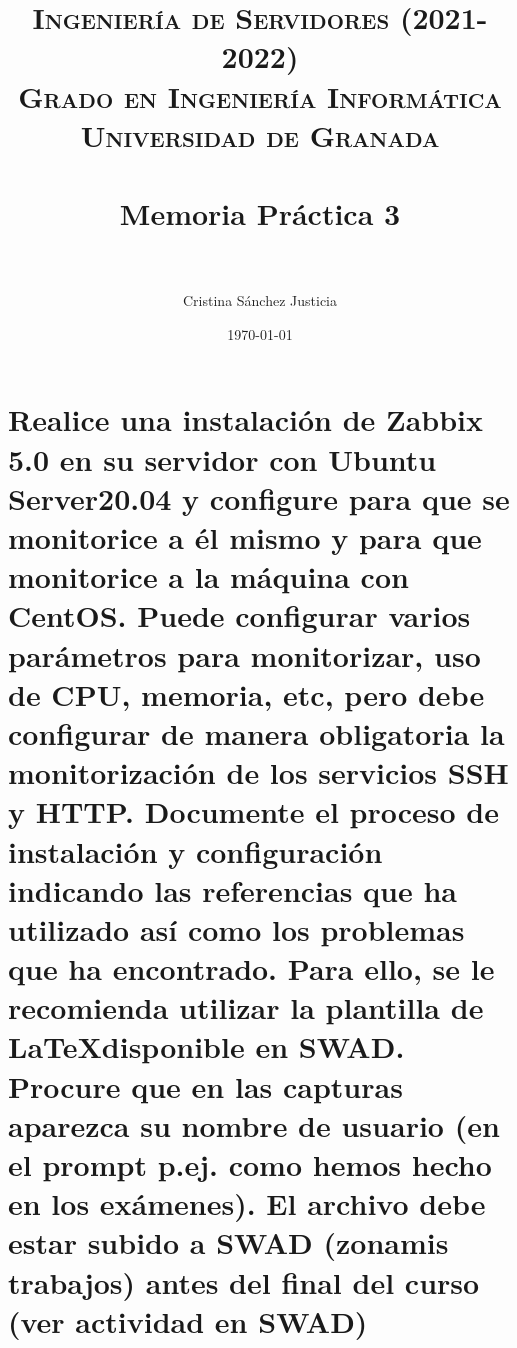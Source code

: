 


\title{	
\normalfont \normalsize 
\textsc{\textbf{Ingeniería de Servidores (2021-2022)} \\ Grado en Ingeniería Informática \\ Universidad de Granada} \\ [25pt] %
\horrule{0.5pt} \\[0.4cm] %
\huge Memoria Práctica 3 \\ %
\horrule{2pt} \\[0.5cm] %
}

\author{Cristina Sánchez Justicia} %

\date{\normalsize\today} %




\maketitle %

\newpage %

\tableofcontents %

\listoffigures

\listoftables

\newpage


\section{Realice una instalación de Zabbix 5.0 en su servidor con Ubuntu Server20.04 y configure para que se monitorice a él mismo y para que monitorice a la máquina con CentOS. 
Puede configurar varios parámetros para monitorizar, uso de CPU, memoria, etc, pero debe configurar de manera obligatoria la monitorización de los servicios SSH y HTTP. 
Documente el proceso de instalación y configuración indicando las referencias que ha utilizado así como los problemas que ha encontrado. Para ello, se le recomienda utilizar la plantilla de \LaTeX disponible en SWAD. Procure que en las capturas aparezca su nombre de usuario (en el prompt p.ej. como hemos hecho en los exámenes). El archivo debe estar subido a SWAD (zonamis trabajos) antes del final del curso (ver actividad en SWAD)}

